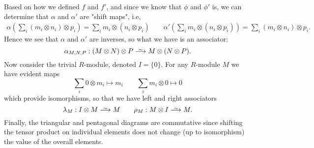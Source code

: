 \begin{example}
\begin{center}
        \hspace{1cm}
    \end{center}
    Based on how we defined $f$ and $f'$, and since we know that $\phi$ and $\phi'$ 
    is, we can determine that $\alpha$ and $\alpha'$ are "shift maps", i.e, 
    \begin{align*}
        \alpha\left( \sum_{i}(m_i \otimes n_i)\otimes p_i \right) = \sum_{i}m_i\otimes(n_i \otimes p_i)
        \qquad
        \alpha'\left( \sum_{i}m_i \otimes (n_i \otimes p_i) \right) = \sum_{i}(m_i\otimes n_i )\otimes p_i.
    \end{align*}
    Hence we see that $\alpha$ and $\alpha'$ are inverses, so what we have is an associator: 
    \[
        \alpha_{M,N,P} : (M\otimes N)\otimes P \isomarrow M\otimes(N\otimes P).
    \]
    Now consider the trivial $R$-module, denoted $I = \{0\}$. For any $R$-module $M$ we have evident maps
    \[
        \sum_{i} 0\otimes m_i \mapsto m_i \qquad \sum_{i}m_i\otimes 0 \mapsto 0    
    \]
    which provide isomorphisms, so that we have left and right associators 
    \[
        \lambda_M: I \otimes M \isomarrow M \qquad 
        \rho_M: M\otimes I \isomarrow M.
    \]
    Finally, the triangular and pentagonal diagrams are commutative since shifting
    the tensor product on individual elements does not change (up to isomorphism) the 
    value of the overall elements. 
\end{example}

